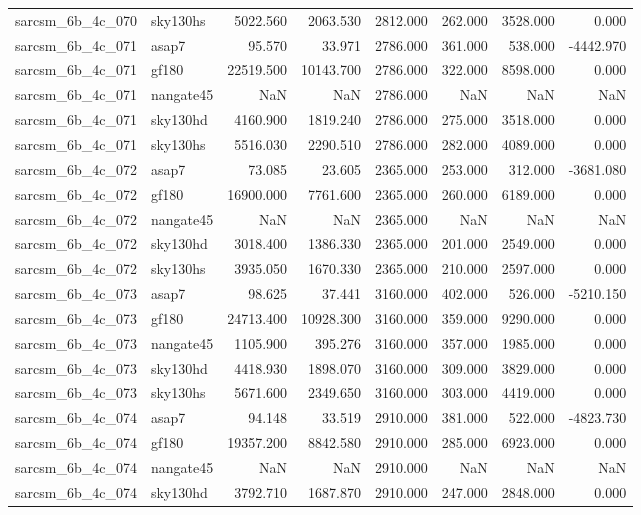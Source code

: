\begin{tabular}{llrrrrrr}
sarcsm\_6b\_4c\_070 & sky130hs & 5022.560 & 2063.530 & 2812.000 & 262.000 & 3528.000 & 0.000 \\
sarcsm\_6b\_4c\_071 & asap7 & 95.570 & 33.971 & 2786.000 & 361.000 & 538.000 & -4442.970 \\
sarcsm\_6b\_4c\_071 & gf180 & 22519.500 & 10143.700 & 2786.000 & 322.000 & 8598.000 & 0.000 \\
sarcsm\_6b\_4c\_071 & nangate45 & NaN & NaN & 2786.000 & NaN & NaN & NaN \\
sarcsm\_6b\_4c\_071 & sky130hd & 4160.900 & 1819.240 & 2786.000 & 275.000 & 3518.000 & 0.000 \\
sarcsm\_6b\_4c\_071 & sky130hs & 5516.030 & 2290.510 & 2786.000 & 282.000 & 4089.000 & 0.000 \\
sarcsm\_6b\_4c\_072 & asap7 & 73.085 & 23.605 & 2365.000 & 253.000 & 312.000 & -3681.080 \\
sarcsm\_6b\_4c\_072 & gf180 & 16900.000 & 7761.600 & 2365.000 & 260.000 & 6189.000 & 0.000 \\
sarcsm\_6b\_4c\_072 & nangate45 & NaN & NaN & 2365.000 & NaN & NaN & NaN \\
sarcsm\_6b\_4c\_072 & sky130hd & 3018.400 & 1386.330 & 2365.000 & 201.000 & 2549.000 & 0.000 \\
sarcsm\_6b\_4c\_072 & sky130hs & 3935.050 & 1670.330 & 2365.000 & 210.000 & 2597.000 & 0.000 \\
sarcsm\_6b\_4c\_073 & asap7 & 98.625 & 37.441 & 3160.000 & 402.000 & 526.000 & -5210.150 \\
sarcsm\_6b\_4c\_073 & gf180 & 24713.400 & 10928.300 & 3160.000 & 359.000 & 9290.000 & 0.000 \\
sarcsm\_6b\_4c\_073 & nangate45 & 1105.900 & 395.276 & 3160.000 & 357.000 & 1985.000 & 0.000 \\
sarcsm\_6b\_4c\_073 & sky130hd & 4418.930 & 1898.070 & 3160.000 & 309.000 & 3829.000 & 0.000 \\
sarcsm\_6b\_4c\_073 & sky130hs & 5671.600 & 2349.650 & 3160.000 & 303.000 & 4419.000 & 0.000 \\
sarcsm\_6b\_4c\_074 & asap7 & 94.148 & 33.519 & 2910.000 & 381.000 & 522.000 & -4823.730 \\
sarcsm\_6b\_4c\_074 & gf180 & 19357.200 & 8842.580 & 2910.000 & 285.000 & 6923.000 & 0.000 \\
sarcsm\_6b\_4c\_074 & nangate45 & NaN & NaN & 2910.000 & NaN & NaN & NaN \\
sarcsm\_6b\_4c\_074 & sky130hd & 3792.710 & 1687.870 & 2910.000 & 247.000 & 2848.000 & 0.000 \\

\end{tabular}

